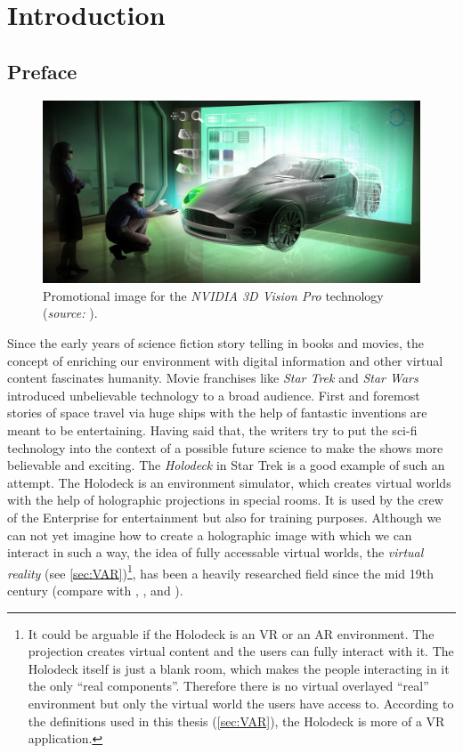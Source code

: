 \chapter{Introduction}
\section{Preface} \label{sec:preface}

\begin{figure}[htbp]
		\centering
		\includegraphics[width=1.0\textwidth]{figures/nvidia-3d-vision-pro}
		\caption[Promotional image for the NVIDIA 3D Vision Pro technology]{Promotional image for the \textit{NVIDIA 3D Vision Pro} technology (\textit{source:} \cite{Gizmag.2010}).}
		\label{fig:3dVisionary}
\end{figure}

Since the early years of science fiction story telling in books and movies, the concept of enriching our environment with digital information and other virtual content fascinates humanity. Movie franchises like \textit{Star Trek} and \textit{Star Wars} introduced unbelievable technology to a broad audience. First and foremost stories of space travel via huge ships with the help of fantastic inventions are meant to be entertaining. Having said that, the writers try to put the sci-fi technology into the context of a possible future science to make the shows more believable and exciting. The \textit{Holodeck} in Star Trek is a good example of such an attempt. The Holodeck is an  environment simulator, which creates virtual worlds with the help of holographic projections in special rooms. It is used by the crew of the Enterprise for entertainment but also for training purposes. Although we can not yet imagine how to create a holographic image with which we can interact in such a way, the idea of fully accessable virtual worlds, the \textit{virtual reality} (see \autoref{sec:VAR})\footnote{It could be arguable if the Holodeck is an VR or an AR environment. The projection creates virtual content and the users can fully interact with it. The Holodeck itself is just a blank room, which makes the people interacting in it the only \enquote{real components}. Therefore there is no virtual overlayed \enquote{real} environment but only the virtual world the users have access to. According to the definitions used in this thesis (\autoref{sec:VAR}), the Holodeck is more of a VR application.}, has been a heavily researched field since the mid 19th century (compare with \cite{Nasa.2009}, \cite[p.3]{Toennis.2010}, \cite[p.19 et seq.]{Doerner.2013} and \cite[p.4 et seq.]{Burdea.2003}).

